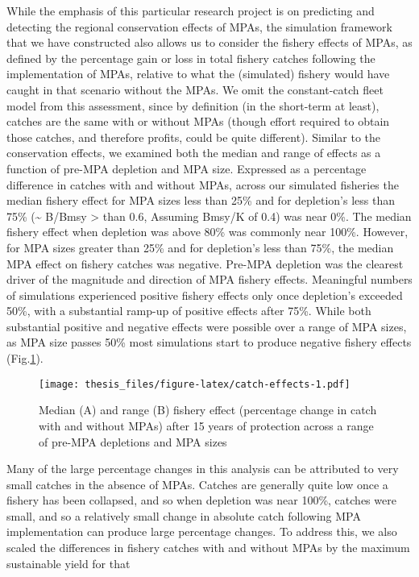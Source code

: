 \documentclass[twoside,12pt,final]{ucthesis-CA2012}
\begin{document}
\begin{ucmainmatter}
While the emphasis of this particular research project is on predicting
and detecting the regional conservation effects of MPAs, the simulation
framework that we have constructed also allows us to consider the
fishery effects of MPAs, as defined by the percentage gain or loss in
total fishery catches following the implementation of MPAs, relative to
what the (simulated) fishery would have caught in that scenario without
the MPAs. We omit the constant-catch fleet model from this assessment,
since by definition (in the short-term at least), catches are the same
with or without MPAs (though effort required to obtain those catches,
and therefore profits, could be quite different). Similar to the
conservation effects, we examined both the median and range of effects
as a function of pre-MPA depletion and MPA size. Expressed as a
percentage difference in catches with and without MPAs, across our
simulated fisheries the median fishery effect for MPA sizes less than
25\% and for depletion's less than 75\% (\textasciitilde{} B/Bmsy
\textgreater{} than 0.6, Assuming Bmsy/K of 0.4) was near 0\%. The
median fishery effect when depletion was above 80\% was commonly near
100\%. However, for MPA sizes greater than 25\% and for depletion's less
than 75\%, the median MPA effect on fishery catches was negative.
Pre-MPA depletion was the clearest driver of the magnitude and direction
of MPA fishery effects. Meaningful numbers of simulations experienced
positive fishery effects only once depletion's exceeded 50\%, with a
substantial ramp-up of positive effects after 75\%. While both
substantial positive and negative effects were possible over a range of
MPA sizes, as MPA size passes 50\% most simulations start to produce
negative fishery effects (Fig.\ref{fig:catch-effects}).
\begin{figure}
\centering
\texttt{[image: thesis\_files/figure-latex/catch-effects-1.pdf]}
\caption{\label{fig:catch-effects}Median (A) and range (B) fishery effect
(percentage change in catch with and without MPAs) after 15 years of
protection across a range of pre-MPA depletions and MPA sizes}
\end{figure}
Many of the large percentage changes in this analysis can be attributed
to very small catches in the absence of MPAs. Catches are generally
quite low once a fishery has been collapsed, and so when depletion was
near 100\%, catches were small, and so a relatively small change in
absolute catch following MPA implementation can produce large percentage
changes. To address this, we also scaled the differences in fishery
catches with and without MPAs by the maximum sustainable yield for that

\end{ucmainmatter}
\end{document}
